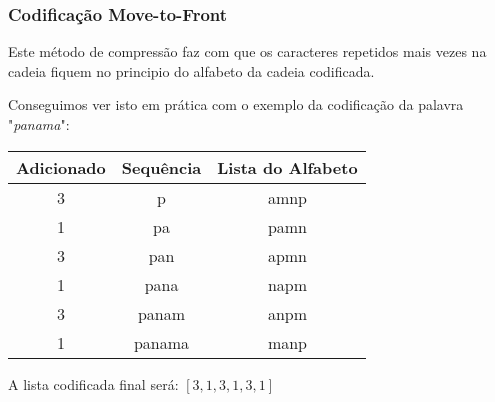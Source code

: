 \documentclass[10pt,journal,compsoc]{IEEEtran}
\begin{document}
    
    
    
    
    \subsubsection{Codificação \textbf{Move-to-Front}}
    Este método de compressão faz com que os caracteres repetidos mais vezes na cadeia fiquem no principio do alfabeto da cadeia codificada. 
    
    
    Conseguimos ver isto em prática com o exemplo da codificação da palavra "\textit{panama}":
    
    \begin{center}
    \begin{tabular}{ |c|c|c| } 
      \hline
      Adicionado & Sequência & Lista do Alfabeto\\
      \hline
      3 & p & amnp\\
      \hline
      1 & pa & pamn\\
      \hline
      3 & pan & apmn\\
      \hline
      1 & pana & napm\\
      \hline
      3 & panam & anpm\\
      \hline
      1 & panama & manp\\
      \hline
    \end{tabular}
    \end{center}
        A lista codificada final será:
    $[3,1,3,1,3,1]$
    
    
\end{document}
